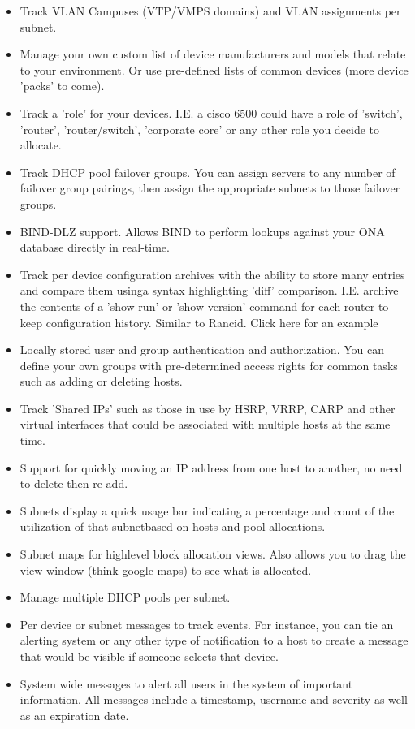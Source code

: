 \documentclass[11pt,a4paper,parskip=half]{scrartcl}
\begin{document}
\begin{itemize}
\item{Track VLAN Campuses (VTP/VMPS domains) and VLAN assignments per subnet.}
\item{Manage your own custom list of device manufacturers and models that relate to your environment. Or use pre-defined lists of common devices (more device 'packs' to come).}
\item{Track a 'role' for your devices. I.E. a cisco 6500 could have a role of 'switch', 'router', 'router/switch', 'corporate core' or any other role you decide to allocate.}
\item{Track DHCP pool failover groups. You can assign servers to any number of failover group pairings, then assign the appropriate subnets to those failover groups.}
\item{BIND-DLZ support. Allows BIND to perform lookups against your ONA database directly in real-time.}
\item{Track per device configuration archives with the ability to store many entries and compare them usinga syntax highlighting 'diff' comparison. I.E. archive the contents of a 'show run' or 'show version' command for each router to keep configuration history. Similar to Rancid. Click here for an example}
\item{Locally stored user and group authentication and authorization. You can define your own groups with pre-determined access rights for common tasks such as adding or deleting hosts.}
\item{Track 'Shared IPs' such as those in use by HSRP, VRRP, CARP and other virtual interfaces that could be associated with multiple hosts at the same time.}
\item{Support for quickly moving an IP address from one host to another, no need to delete then re-add.}
\item{Subnets display a quick usage bar indicating a percentage and count of the utilization of that subnetbased on hosts and pool allocations.}
\item{Subnet maps for highlevel block allocation views. Also allows you to drag the view window (think google maps) to see what is allocated.}
\item{Manage multiple DHCP pools per subnet.}
\item{Per device or subnet messages to track events. For instance, you can tie an alerting system or any other type of notification to a host to create a message that would be visible if someone selects that device.}
\item{System wide messages to alert all users in the system of important information. All messages include a timestamp, username and severity as well as an expiration date.}

\end{itemize}
\end{document}
